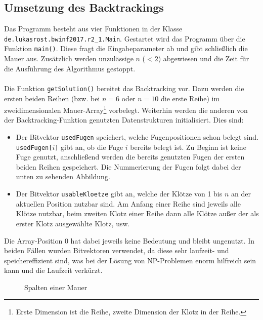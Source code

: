 \documentclass[a4paper, notitlepage, 12pt]{scrartcl}
\begin{document}
\subsection{Umsetzung des Backtrackings}
Das Programm besteht aus vier Funktionen in der Klasse \texttt{de.lukasrost.bwinf2017.r2\_1.Main}. Gestartet wird das Programm über die Funktion \texttt{main()}. Diese fragt die Eingabeparameter ab und gibt schließlich die Mauer aus. Zusätzlich werden unzulässige $n$ ($< 2$) abgewiesen und die Zeit für die Ausführung des Algorithmus gestoppt. \\ \\
Die Funktion \texttt{getSolution()} bereitet das Backtracking vor. Dazu werden die ersten beiden Reihen (bzw. bei $n = 6$ oder $n = 10$ die erste Reihe) im zweidimensionalen Mauer-Array\footnote{Erste Dimension ist die Reihe, zweite Dimension der Klotz in der Reihe.} vorbelegt. Weiterhin werden die anderen von der Backtracking-Funktion genutzten Datenstrukturen initialisiert. Dies sind: 
\begin{itemize}
\item Der Bitvektor \texttt{usedFugen} speichert, welche Fugenpositionen schon belegt sind. \texttt{usedFugen[$i$]} gibt an, ob die Fuge $i$ bereits belegt ist. Zu Beginn ist keine Fuge genutzt, anschließend werden die bereits genutzten Fugen der ersten beiden Reihen gespeichert. Die Nummerierung der Fugen folgt dabei der unten zu sehenden Abbildung.
\item Der Bitvektor \texttt{usableKloetze} gibt an, welche der Klötze von 1 bis $n$ an der aktuellen Position nutzbar sind. Am Anfang einer Reihe sind jeweils alle Klötze nutzbar, beim zweiten Klotz einer Reihe dann alle Klötze außer der als erster Klotz ausgewählte Klotz, usw.
\end{itemize}
Die Array-Position $0$ hat dabei jeweils keine Bedeutung und bleibt ungenutzt. In beiden Fällen wurden Bitvektoren verwendet, da diese sehr laufzeit- und speichereffizient sind, was bei der Lösung von NP-Problemen enorm hilfreich sein kann und die Laufzeit verkürzt. \\
\begin{figure}[H]
	\centering
	\caption{Spalten einer Mauer}
\end{figure}
\end{document}
